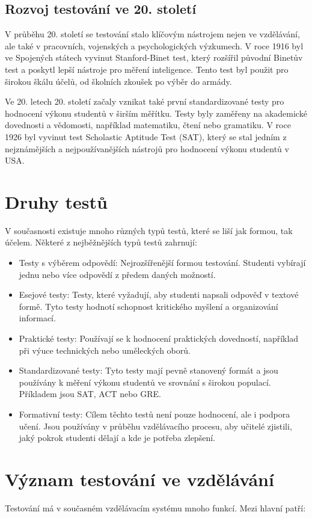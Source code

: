 \documentclass[12pt, a4paper, twoside, openright]{report}
\begin{document}
\subsection{Rozvoj testování ve 20. století}
V průběhu 20. století se testování stalo klíčovým nástrojem nejen ve vzdělávání, ale také v pracovních, vojenských a psychologických výzkumech. V roce 1916 byl ve Spojených státech vyvinut Stanford-Binet test, který rozšířil původní Binetův test a poskytl lepší nástroje pro měření inteligence. Tento test byl použit pro širokou škálu účelů, od školních zkoušek po výběr do armády.

Ve 20. letech 20. století začaly vznikat také první standardizované testy pro hodnocení výkonu studentů v širším měřítku. Testy byly zaměřeny na akademické dovednosti a vědomosti, například matematiku, čtení nebo gramatiku. V roce 1926 byl vyvinut test Scholastic Aptitude Test (SAT), který se stal jedním z nejznámějších a nejpoužívanějších nástrojů pro hodnocení výkonu studentů v USA.

\section{Druhy testů}
V současnosti existuje mnoho různých typů testů, které se liší jak formou, tak účelem. Některé z nejběžnějších typů testů zahrnují:

\begin{itemize}
	\item Testy s výběrem odpovědí: Nejrozšířenější formou testování. Studenti vybírají jednu nebo více odpovědí z předem daných možností.
	\item Esejové testy: Testy, které vyžadují, aby studenti napsali odpověď v textové formě. Tyto testy hodnotí schopnost kritického myšlení a organizování informací.
	\item Praktické testy: Používají se k hodnocení praktických dovedností, například při výuce technických nebo uměleckých oborů.
	\item Standardizované testy: Tyto testy mají pevně stanovený formát a jsou používány k měření výkonu studentů ve srovnání s širokou populací. Příkladem jsou SAT, ACT nebo GRE.
	\item Formativní testy: Cílem těchto testů není pouze hodnocení, ale i podpora učení. Jsou používány v průběhu vzdělávacího procesu, aby učitelé zjistili, jaký pokrok studenti dělají a kde je potřeba zlepšení.
\end{itemize}

\section{Význam testování ve vzdělávání}
Testování má v současném vzdělávacím systému mnoho funkcí. Mezi hlavní patří:
\end{document}
